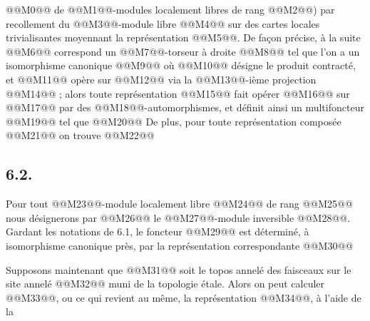 
@@M0@@ de @@M1@@-modules localement libres de rang @@M2@@) par recollement du @@M3@@-module libre @@M4@@ sur des cartes locales trivialisantes moyennant la représentation @@M5@@. De façon précise, à la suite @@M6@@ correspond un @@M7@@-torseur à droite @@M8@@ tel que l'on a un isomorphisme canonique
@@M9@@
où @@M10@@ désigne le produit contracté, et @@M11@@ opère sur @@M12@@ via la @@M13@@-ième projection @@M14@@ ; alors toute représentation
@@M15@@
fait opérer @@M16@@ sur @@M17@@ par des @@M18@@-automorphismes, et définit ainsi un multifoncteur @@M19@@ tel que
@@M20@@
De plus, pour toute représentation composée @@M21@@ on trouve
@@M22@@

\subsection*{6.2.}
Pour tout @@M23@@-module localement libre @@M24@@ de rang @@M25@@ nous désignerons par @@M26@@ le @@M27@@-module inversible @@M28@@. Gardant les notations de 6.1, le foncteur @@M29@@ est déterminé, à isomorphisme canonique près, par la représentation correspondante
@@M30@@

Supposons maintenant que @@M31@@ soit le topos annelé des faisceaux sur le site annelé @@M32@@ muni de la topologie étale. Alors on peut calculer @@M33@@, ou ce qui revient au même, la représentation @@M34@@, à l'aide de la

